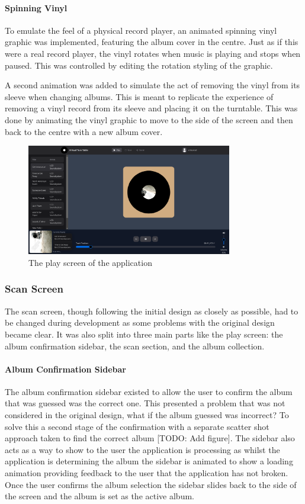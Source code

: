 \paragraph{Spinning Vinyl}
To emulate the feel of a physical record player, an animated spinning vinyl graphic was implemented, featuring the album cover in the centre. Just as if this were a real record player, the vinyl rotates when music is playing and stops when paused. This was controlled by editing the rotation styling of the graphic.

A second animation was added to simulate the act of removing the vinyl from its sleeve when changing albums. This is meant to replicate the experience of removing a vinyl record from its sleeve and placing it on the turntable. This was done by animating the vinyl graphic to move to the side of the screen and then back to the centre with a new album cover.

\begin{figure} [H]
    \centering
    \includegraphics[width=0.8\textwidth]{figures/play_screen.png}
    \caption{The play screen of the application}
    \label{fig:play_screen}
\end{figure}

\subsubsection{Scan Screen}
The scan screen, though following the initial design as closely as possible, had to be changed during development as some problems with the original design became clear. It was also split into three main parts like the play screen: the album confirmation sidebar, the scan section, and the album collection.

\paragraph{Album Confirmation Sidebar}
The album confirmation sidebar existed to allow the user to confirm the album that was guessed was the correct one. This presented a problem that was not considered in the original design, what if the album guessed was incorrect? To solve this a second stage of the confirmation with a separate scatter shot approach taken to find the correct album [TODO: Add figure]. The sidebar also acts as a way to show to the user the application is processing as whilst the application is determining the album the sidebar is animated to show a loading animation providing feedback to the user that the application has not broken. Once the user confirms the album selection the sidebar slides back to the side of the screen and the album is set as the active album.


